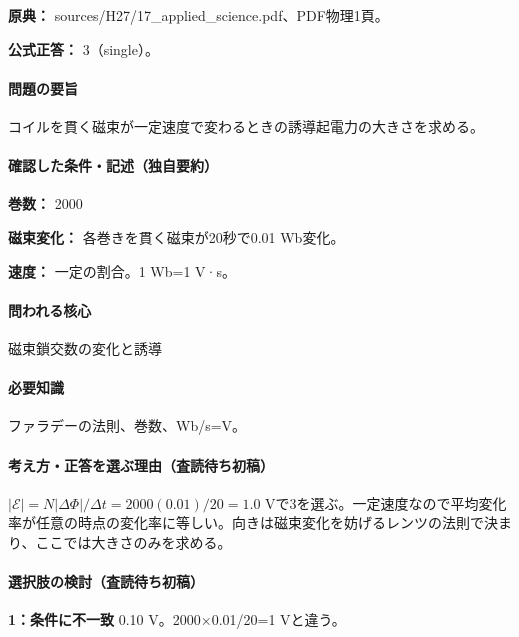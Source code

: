 \noindent\textbf{原典：} sources/H27/17\_applied\_science.pdf、PDF物理1頁。

\textbf{公式正答：} 3（single）。

\paragraph{問題の要旨} コイルを貫く磁束が一定速度で変わるときの誘導起電力の大きさを求める。

\paragraph{確認した条件・記述（独自要約）}\mbox{}\par

\noindent\textbf{巻数：} 2000\par

\noindent\textbf{磁束変化：} 各巻きを貫く磁束が20秒で0.01 Wb変化。\par

\noindent\textbf{速度：} 一定の割合。1 Wb=\allowbreak{}1 V·s。\par

\paragraph{問われる核心} 磁束鎖交数の変化と誘導

\paragraph{必要知識} ファラデーの法則、巻数、Wb/s=\allowbreak{}V。

\paragraph{考え方・正答を選ぶ理由（査読待ち初稿）} \(|\mathcal E|=N|\Delta\Phi|/\Delta t=2000(0.01)/20=1.0\) Vで3を選ぶ。一定速度なので平均変化率が任意の時点の変化率に等しい。向きは磁束変化を妨げるレンツの法則で決まり、ここでは大きさのみを求める。

\paragraph{選択肢の検討（査読待ち初稿）}\mbox{}\par

\noindent\textbf{1：条件に不一致} 0.10 V。2000×0.01/20=\allowbreak{}1 Vと違う。\par

